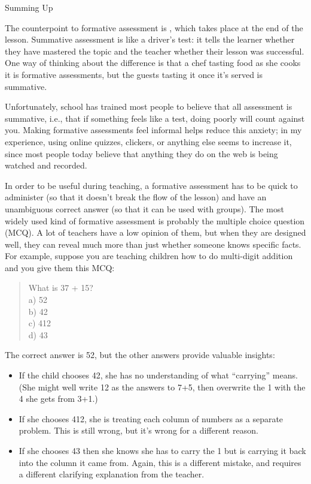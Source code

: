 \begin{aside}{Summing Up}

  The counterpoint to formative assessment is ,
  which takes place at the end of the lesson.
  Summative assessment is like a driver's test:
  it tells the learner whether they have mastered the topic
  and the teacher whether their lesson was successful.
  One way of thinking about the difference is that
  a chef tasting food as she cooks it is formative assessments,
  but the guests tasting it once it's served is summative.

  Unfortunately,
  school has trained most people to believe that all assessment is summative,
  i.e.,
  that if something feels like a test,
  doing poorly will count against you.
  Making formative assessments feel informal helps reduce this anxiety;
  in my experience,
  using online quizzes, clickers, or anything else seems to increase it,
  since most people today believe that anything they do on the web is being watched and recorded.

\end{aside}
  
In order to be useful during teaching,
a formative assessment has to be quick to administer
(so that it doesn't break the flow of the lesson)
and have an unambiguous correct answer
(so that it can be used with groups).
The most widely used kind of formative assessment is probably the multiple choice question (MCQ).
A lot of teachers have a low opinion of them,
but when they are designed well,
they can reveal much more than just whether someone knows specific facts.
For example,
suppose you are teaching children how to do multi-digit addition \cite{Ojos2015}
and you give them this MCQ:

\begin{quote}
  What is 37 + 15?\\
  a) 52\\
  b) 42\\
  c) 412\\
  d) 43
\end{quote}

The correct answer is 52,
but the other answers provide valuable insights:

\begin{itemize}

\item
  If the child chooses 42,
  she has no understanding of what ``carrying'' means.
  (She might well write 12 as the answers to 7+5,
  then overwrite the 1 with the 4 she gets from 3+1.)

\item
  If she chooses 412,
  she is treating each column of numbers as a separate problem.
  This is still wrong,
  but it's wrong for a different reason.

\item
  If she chooses 43 then she knows she has to carry the 1
  but is carrying it back into the column it came from.
  Again,
  this is a different mistake,
  and requires a different clarifying explanation from the teacher.

\end{itemize}

